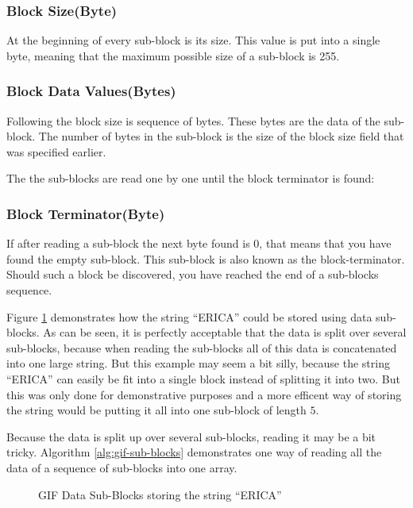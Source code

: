   \subsubsection*{Block Size(Byte)}

  At the beginning of every sub-block is its size. This value is put
  into a single byte, meaning that the maximum possible size of a
  sub-block is 255.

  \subsubsection*{Block Data Values(Bytes)}

  Following the block size is sequence of bytes. These bytes are the
  data of the sub-block. The number of bytes in the sub-block is the
  size of the block size field that was specified earlier.

  The the sub-blocks are read one by one until the block terminator is
  found:

  \subsubsection*{Block Terminator(Byte)}

  If after reading a sub-block the next byte found is 0, that means
  that you have found the empty sub-block. This sub-block is also
  known as the block-terminator. Should such a block be discovered, you
  have reached the end of a sub-blocks sequence.

  Figure \ref{fig:gif-data-sub-blocks} demonstrates how the string
  ``ERICA'' could be stored using data sub-blocks. As can be seen, it
  is perfectly acceptable that the data is split over several
  sub-blocks, because when reading the sub-blocks all of this data is
  concatenated into one large string. But this example may seem a bit
  silly, because the string ``ERICA'' can easily be fit into a single
  block instead of splitting it into two. But this was only done for
  demonstrative purposes and a more efficent way of storing the string
  would be putting it all into one sub-block of length $5$.

  Because the data is split up over several sub-blocks, reading it may
  be a bit tricky. Algorithm \ref{alg:gif-sub-blocks} demonstrates one way of reading all the
  data of a sequence of sub-blocks into one array.

  \begin{figure}
    \centering
    \caption{GIF Data Sub-Blocks storing the string ``ERICA''}
    \label{fig:gif-data-sub-blocks}
  \end{figure}

